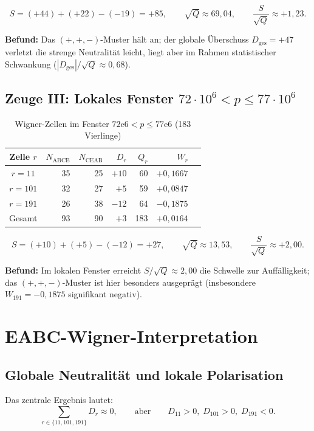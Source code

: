 \documentclass[12pt, a4paper]{article}
\begin{document}
\[
S = (+44) + (+22) - (-19) = +85, \qquad
\sqrt{Q} \approx 69{,}04, \qquad
\frac{S}{\sqrt{Q}} \approx +1{,}23.
\]

\noindent\textbf{Befund:} Das $(+,+,-)$-Muster hält an; der globale Überschuss
$D_{\text{ges}} = +47$ verletzt die strenge Neutralität leicht, liegt aber im
Rahmen statistischer Schwankung ($|D_{\text{ges}}|/\sqrt{Q} \approx 0{,}68$).

\subsection{Zeuge III: Lokales Fenster $72 \cdot 10^6 < p \leq 77 \cdot 10^6$}

\begin{table}[h]
\centering
\caption{Wigner-Zellen im Fenster $72\text{e}6 < p \leq 77\text{e}6$ (183 Vierlinge)}
\label{tab:fenster}
\begin{tabular}{crrrrrr}
\toprule
Zelle $r$ & $N_{\text{ABCE}}$ & $N_{\text{CEAB}}$ & $D_r$ & $Q_r$ & $W_r$ \\
\midrule
$r = 11$  & 35 & 25 & $+10$ & 60 & $+0{,}1667$ \\
$r = 101$ & 32 & 27 & $+5$  & 59 & $+0{,}0847$ \\
$r = 191$ & 26 & 38 & $-12$ & 64 & $-0{,}1875$ \\
\midrule
Gesamt    & 93 & 90 & $+3$  & 183 & $+0{,}0164$ \\
\bottomrule
\end{tabular}
\end{table}

\[
S = (+10) + (+5) - (-12) = +27, \qquad
\sqrt{Q} \approx 13{,}53, \qquad
\frac{S}{\sqrt{Q}} \approx +2{,}00.
\]

\noindent\textbf{Befund:} Im lokalen Fenster erreicht $S/\sqrt{Q} \approx 2{,}00$
die Schwelle zur Auffälligkeit; das $(+,+,-)$-Muster ist hier besonders ausgeprägt
(insbesondere $W_{191} = -0{,}1875$ signifikant negativ).

\section{EABC-Wigner-Interpretation}

\subsection{Globale Neutralität und lokale Polarisation}

Das zentrale Ergebnis lautet:
\[
\boxed{\sum_{r \in \{11,101,191\}} D_r \approx 0,} \qquad
\text{aber} \qquad D_{11} > 0,\; D_{101} > 0,\; D_{191} < 0.
\]
\end{document}
